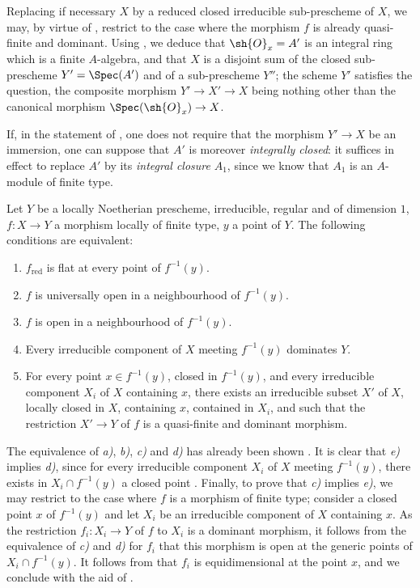Replacing if necessary $X$ by a reduced closed irreducible sub-prescheme of $X$, we may, by virtue of , restrict to the case where the morphism $f$ is already quasi-finite and dominant.
Using , we deduce that $\sh{O}_x=A'$ is an integral ring which is a finite $A$-algebra, and that $X$ is a disjoint sum of the closed sub-prescheme $Y'=\Spec(A')$ and of a sub-prescheme $Y''$; the scheme $Y'$ satisfies the question, the composite morphism $Y'\to X'\to X$ being nothing other than the canonical morphism $\Spec(\sh{O}_x)\to X$.

\begin{remark}[14.5.5]
\label{IV.14.5.5}
If, in the statement of , one does not require that the morphism $Y'\to X$ be an immersion, one can suppose that $A'$ is moreover \emph{integrally closed}: it suffices in effect to replace $A'$ by its \emph{integral closure} $A_1$, since we know  that $A_1$ is an $A$-module of finite type.
\end{remark}

\begin{proposition}[14.5.6]
\label{IV.14.5.6}
Let $Y$ be a locally Noetherian prescheme, irreducible, regular and of dimension $1$, $f:X\to Y$ a morphism locally of finite type, $y$ a point of $Y$.
The following conditions are equivalent:
\begin{enumerate}[label=\emph{\alph*)}]
  \item $f_{\mathrm{red}}$ is flat at every point of $f^{-1}(y)$.
  \item $f$ is universally open in a neighbourhood of $f^{-1}(y)$.
  \item $f$ is open in a neighbourhood of $f^{-1}(y)$.
  \item Every irreducible component of $X$ meeting $f^{-1}(y)$ dominates $Y$.
  \item For every point $x\in f^{-1}(y)$, closed in $f^{-1}(y)$, and every irreducible component $X_i$ of $X$ containing $x$, there exists an irreducible subset $X'$ of $X$, locally closed in $X$, containing $x$, contained in $X_i$, and such that the restriction $X'\to Y$ of $f$ is a quasi-finite and dominant morphism.
\end{enumerate}
\end{proposition}

The equivalence of \emph{a)}, \emph{b)}, \emph{c)} and \emph{d)} has already been shown .
It is clear that \emph{e)} implies \emph{d)}, since for every irreducible component $X_i$ of $X$ meeting $f^{-1}(y)$, there exists in $X_i\cap f^{-1}(y)$ a closed point .
Finally, to prove that \emph{c)} implies \emph{e)}, we may restrict to the case where $f$ is a morphism of finite type; consider a closed point $x$ of $f^{-1}(y)$ and let $X_i$ be an irreducible component of $X$ containing $x$.
As the restriction $f_i:X_i\to Y$ of $f$ to $X_i$ is a dominant morphism, it follows from the equivalence of \emph{c)} and \emph{d)} for $f_i$ that this morphism is open at the generic points of $X_i\cap f^{-1}(y)$. It follows from  that $f_i$ is equidimensional at the point $x$, and we conclude with the aid of .

